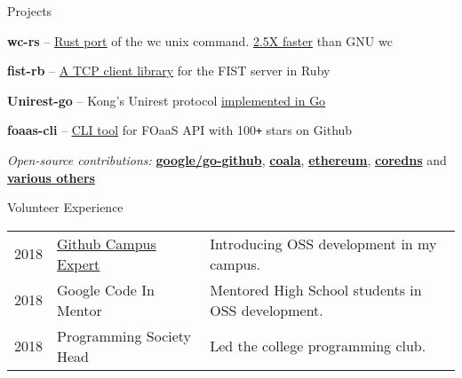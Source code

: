 \documentclass{resume} %
\begin{document}

\begin{rSection}{Projects}
  \begin{rProjectSection}
    \item \textbf {wc-rs} -- \href{https://github.com/palash25/wc-rs}{\underline{Rust port}} of the wc unix command. \underline{2.5X faster} than GNU wc
    \item \textbf {fist-rb} -- \href{https://github.com/palash25/fist-rb}{\underline{A TCP client library}} for the FIST server in Ruby
    \item \textbf {Unirest-go} -- Kong's Unirest protocol \href{https://github.com/palash25/unirest-go}{\underline{implemented in Go}}
    \item \textbf {foaas-cli} -- \href{https://github.com/palash25/foaas-cli}{\underline{CLI tool}} for FOaaS API with 100\texttt{+} stars on Github
  \end{rProjectSection}

  \begin{rBlurbSection}
    \item {\em Open-source contributions:}
      \href{http://bit.ly/2LfMLIW}{\textbf{google/go-github}},
      \href{http://bit.ly/2Quw26G}{\textbf{coala}},
      \href{http://bit.ly/2NLmHsD}{\textbf{ethereum}},
      \href{https://github.com/coredns/coredns/pull/3011}{\textbf{coredns}} and
      \href{http://bit.ly/2lJ4PCy}{\textbf{various others}}
  \end{rBlurbSection}
\end{rSection}


\begin{rSection}{Volunteer Experience}
  \begin{tabular}{rll}
2018	     & {\href{http://bit.ly/2OsNuqI}{Github Campus Expert}}  & Introducing OSS development in my campus.\\
2018	     & Google Code In Mentor  & Mentored High School students in OSS development.\\
2018	     & Programming Society Head  & Led the college programming club.\\
\end{tabular}
\end{rSection}
\end{document}
